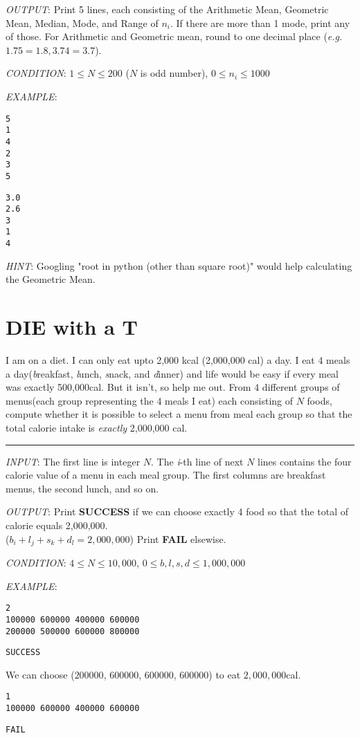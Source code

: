 \documentclass{article}
\begin{document}
\textit{OUTPUT}: Print 5 lines, each consisting of the Arithmetic Mean, Geometric
Mean, Median, Mode, and Range of $n_{i}$. If there are more than 1 mode, print
any of those. For Arithmetic and Geometric mean,
round to one decimal place (\textit{e.g.} $1.75 = 1.8, 3.74 = 3.7$).

\textit{CONDITION}: $ 1 \le N \le 200$ ($N$ is odd number),  $ 0 \le n_{i} \le 1000$

\textit{EXAMPLE}:
\begin{lstlisting}
5
1
4
2
3
5
\end{lstlisting}

\begin{lstlisting}
3.0
2.6
3
1
4
\end{lstlisting}

\textit{HINT}: Googling "root in python (other than square root)" would help
calculating the Geometric Mean.


\section{DIE with a T}
I am on a diet. I can only eat upto 2,000 kcal (2,000,000 cal) a day.
I eat 4 meals a day(\textit{b}reakfast, \textit{l}unch, \textit{s}nack, and
\textit{d}inner) and life would be easy if
every meal was exactly 500,000cal. But it isn't, so help me out.
From 4 different groups of menus(each group representing the 4 meals I eat)
each consisting of $N$ foods, compute whether it is possible to select a menu
from meal each group
so that the total calorie intake is \textit{exactly} 2,000,000 cal.\\
\noindent\rule{\textwidth}{0.9pt}
\textit{INPUT}: The first line is integer $N$.
The \textit{i}-th line of next $N$ lines contains the four calorie value of a
menu in each meal group. The first columns are breakfast menus, the
second lunch, and so on.

\textit{OUTPUT}: Print \textbf{SUCCESS} if we can choose exactly 4 food so that
the total of calorie equals 2,000,000.\\($b_{i}+l_{j}+s_{k}+d_{l} = 2,000,000$)
Print \textbf{FAIL} elsewise.

\textit{CONDITION}: $ 4 \le N \le 10,000$, $ 0 \le b,l,s,d \le 1,000,000$

\textit{EXAMPLE}:
\begin{lstlisting}
2
100000 600000 400000 600000
200000 500000 600000 800000
\end{lstlisting}
\begin{lstlisting}
SUCCESS
\end{lstlisting}
We can choose ($200000$, $600000$, $600000$, $600000$) to eat $2,000,000$cal.
\begin{lstlisting}
1
100000 600000 400000 600000
\end{lstlisting}
\begin{lstlisting}
FAIL
\end{lstlisting}
\end{document}
